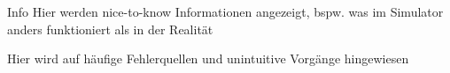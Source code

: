 \begin{infoblock}{Info}
	Hier werden nice-to-know Informationen angezeigt, bspw. was im Simulator anders funktioniert als in der Realität
\end{infoblock}

\begin{warningblock}
	Hier wird auf häufige Fehlerquellen und unintuitive Vorgänge hingewiesen
\end{warningblock}

